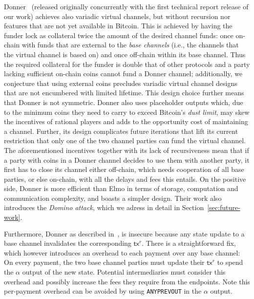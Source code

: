   Donner~\cite{donner}
    (released originally concurrently with the first technical report release of our work) 
achieves also variadic
  virtual channels, but without recursion nor features that are not yet
  available in Bitcoin. This is achieved by having the funder lock as
  collateral twice the amount of the desired channel funds: once on-chain with
  funds that are external to the \emph{base channels} (i.e., the channels that the
  virtual channel is based on) and once off-chain within its base channel. Thus
  the required collateral for the funder is double that of other protocols and
  a party lacking sufficient on-chain coins cannot fund a Donner channel;
  additionally, we conjecture that using external coins precludes variadic
  virtual channel designs that are not encumbered with limited lifetime. This
  design choice further means that Donner is not symmetric. Donner also uses
  placeholder outputs which, due to the minimum coins they need to carry to
  exceed Bitcoin's \emph{dust limit}, may skew the incentives of rational players
  and adds to the
  opportunity cost of maintaining a channel. Further, its design complicates
  future iterations that lift its current restriction that only one of the two
  channel parties can fund the virtual channel. The aforementioned incentives
  together with its lack of recursiveness mean that if a party with coins in a
  Donner channel decides to use them with another party, it first has to close
  its channel either off-chain, which needs cooperation of all base parties, or
  else on-chain, with all the delays and fees this entails.
  On the positive side, Donner is
  more efficient than Elmo in terms of storage, computation and communication
  complexity, and boasts a simpler design. 
  Their work also introduces the \emph{Domino attack},
  which we adress in detail in Section~\ref{sec:future-work}.

  Furthermore,  Donner as described in~\cite{donner}, 
  is insecure because any state update to a base
  channel invalidates the corresponding $\mathsf{tx}^r$. There is a
  straightforward fix, which however introduces an overhead to each payment over
  any base channel: On every payment, the two base channel parties must update
  their $\mathsf{tx}^r$ to spend the $\alpha$ output of the new state. Potential
  intermediaries must consider this overhead and possibly increase the fees they
  require from the endpoints. Note this per-payment overhead can be avoided by using
  \texttt{ANYPREVOUT} in the $\alpha$ output.

